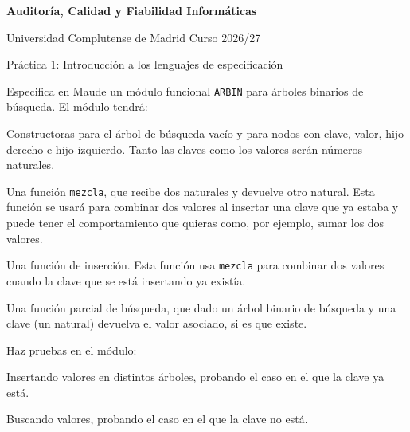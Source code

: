 

\usepackage{pgf}
\usepackage{tikz}
\usepackage{pstricks,pst-node,pst-tree,pstricks-add}



\begin{center}
{\Large\textbf{Auditor\'ia, Calidad y Fiabilidad Inform\'aticas}}
\smallskip

\large
Universidad Complutense de Madrid \qquad Curso 2026/27
\medskip

Pr\'actica 1: Introducci\'on a los lenguajes de especificaci\'on\hfill\mbox{}

\noindent\hrulefill
\end{center}

\begin{listaejercicios}

\item
Especifica en Maude un m\'odulo funcional \verb"ARBIN" para \'arboles binarios de b\'usqueda. El m\'odulo
tendr\'a:

\begin{listaalph}
\item
Constructoras para el \'arbol de b\'usqueda vac\'io y para nodos con clave, valor, hijo derecho e hijo izquierdo.
Tanto las claves como los valores ser\'an n\'umeros naturales.

\item
Una funci\'on \verb"mezcla", que recibe dos naturales y devuelve otro natural. Esta funci\'on se usar\'a
para combinar dos valores al insertar una clave que ya estaba y puede tener el comportamiento que
quieras como, por ejemplo, sumar los dos valores.

\item
Una funci\'on de inserci\'on. Esta funci\'on usa \verb"mezcla" para combinar
dos valores cuando la clave que se est\'a insertando ya exist\'ia.

\item
Una funci\'on parcial de b\'usqueda, que dado un \'arbol binario de b\'usqueda y una clave (un natural) devuelva
el valor asociado, si es que existe.

\end{listaalph}

\item
Haz pruebas en el m\'odulo:

\begin{listaalph}

\item
Insertando valores en distintos \'arboles, probando el caso en el que la clave ya est\'a.

\item
Buscando valores, probando el caso en el que la clave no est\'a.

\end{listaalph}

\end{listaejercicios}


